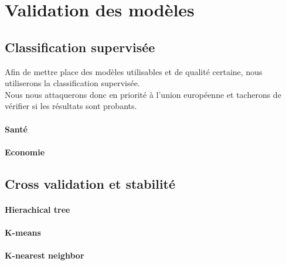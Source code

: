 \section{Validation des modèles}


\subsection{Classification supervisée}
Afin de mettre place des modèles utilisables et de qualité certaine, nous utiliserons la classification supervisée.\\
Nous nous attaquerons donc en priorité à l'union européenne et tacherons de vérifier si les résultats sont probants.

\paragraph{Santé}

\paragraph{Economie}

\subsection{Cross validation et stabilité}

\paragraph{Hierachical tree}

\paragraph{K-means}

\paragraph{K-nearest neighbor}